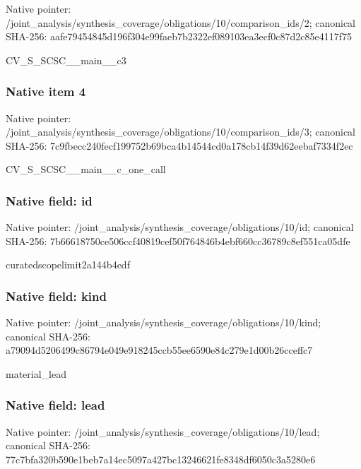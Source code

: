 \documentclass[10pt,a4paper]{article}
\begin{document}
Native pointer: /joint\_analysis/synthesi\allowbreak{}s\_coverage/obligations/1\allowbreak{}0/comparison\_ids/2; canonical SHA-256: aafe79454845d196f304e99f\allowbreak{}aeb7b2322ef089103ea3ecf0\allowbreak{}c87d2c85e4117f75


CV\_S\_SCSC\_\_main\_\_c3


\subsubsection{Native item 4}


Native pointer: /joint\_analysis/synthesi\allowbreak{}s\_coverage/obligations/1\allowbreak{}0/comparison\_ids/3; canonical SHA-256: 7c9fbecc240fecf199752b69\allowbreak{}bca4b14544cd0a178cb14f39\allowbreak{}d62eebaf7334f2ec


CV\_S\_SCSC\_\_main\_\_c\_one\_call


\subsubsection{Native field: id}


Native pointer: /joint\_analysis/synthesi\allowbreak{}s\_coverage/obligations/1\allowbreak{}0/id; canonical SHA-256: 7b66618750ce506ccf40819c\allowbreak{}ef50f764846b4ebf660cc367\allowbreak{}89c8ef551ca05dfe


curatedscopelimit2a144b4edf


\subsubsection{Native field: kind}


Native pointer: /joint\_analysis/synthesi\allowbreak{}s\_coverage/obligations/1\allowbreak{}0/kind; canonical SHA-256: a79094d5206499c86794e049\allowbreak{}e918245ccb55ee6590e84c27\allowbreak{}9e1d00b26cceffc7


material\_lead


\subsubsection{Native field: lead}


Native pointer: /joint\_analysis/synthesi\allowbreak{}s\_coverage/obligations/1\allowbreak{}0/lead; canonical SHA-256: 77c7bfa320b590e1beb7a14e\allowbreak{}c5097a427bc13246621fe834\allowbreak{}8df6050c3a5280e6
\end{document}
